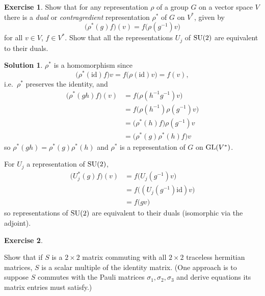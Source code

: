\documentclass[11pt, a4paper]{report}
\theoremstyle{definition}
\newtheorem{ex}{Exercise}[part]
\newtheorem{sol}{Solution}[part]
\newcommand*{\GL}{\ensuremath\text{GL}}
\newcommand*{\SU}{\ensuremath\text{SU}}
\begin{document}
\begin{ex}

Show that for any representation $\rho$ of a group $G$ on a vector space $V$ there is a \emph{dual} or \emph{contragredient} representation $\rho^*$ of $G$ on $V^*$, given by
\[
    \bigl( \rho^*(g) f \bigr) (v) = f \bigl( \rho(g^{-1}) v \bigr)
\]
for all $v \in V$, $f \in V^*$.
Show that all the representations $U_j$ of $\SU(2)$ are equivalent to their duals.

\end{ex}

\begin{sol}

$\rho^*$ is a homomorphism since
\[
    \bigl( \rho^*(\text{id}) f \bigr) v = f \bigl(\rho(\text{id}) v \bigr) = f(v),
\]
i.e.\ $\rho^*$ preserves the identity, and
\begin{align*}
    \bigl( \rho^*(gh) f \bigr) (v) &= f \bigl( \rho(h^{-1} g^{-1}) v \bigr) \\
        &= f \bigl( \rho(h^{-1}) \rho(g^{-1}) v \bigr) \\
        &= \bigl( \rho^*(h) f \bigr) \rho(g^{-1}) v \\
        &= \bigl( \rho^*(g) \rho^*(h) f \bigr) v
\end{align*}
so $\rho^*(gh) = \rho^*(g) \rho^*(h)$ and $\rho^*$ is a representation of $G$ on $\GL(V^*)$.

For $U_j$ a representation of $\SU(2)$,
\begin{align*}
    \bigl( U_j^*(g) f \bigr) (v) &= f \bigl( U_j(g^{-1}) v \bigr) \\
                                 &= f \bigl( (U_j(g^{-1}) \text{id}) v \bigr) \\
                                 &= f \bigl( g v \bigr)
\end{align*}
so representations of $\SU(2)$ are equivalent to their duals (isomorphic via the adjoint).

\end{sol}

\begin{ex}\label{ex:commutativescalarmultipleidentity}

Show that if $S$ is a $2 \times 2$ matrix commuting with all $2 \times 2$ traceless hermitian matrices, $S$ is a scalar multiple of the identity matrix.
(One approach is to suppose $S$ commutes with the Pauli matrices $\sigma_1, \sigma_2, \sigma_3$ and derive equations its matrix entries must satisfy.)

\end{ex}
\end{document}

